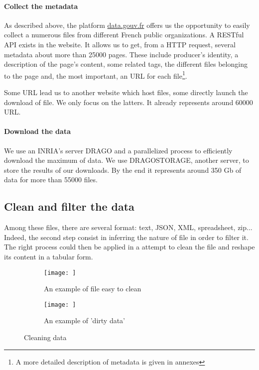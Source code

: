 \documentclass[a4paper]{article}
\begin{document}
	\paragraph{Collect the metadata}
	
	As described above, the platform \href{http://www.data.gouv.fr/fr/}{data.gouv.fr} offers us the opportunity to easily collect a numerous files from different French public organizations. A RESTful API exists in the website. It allows us to get, from a HTTP request, several metadata about more than 25000 pages. These include producer's identity, a description of the page's content, some related tags, the different files belonging to the page and, the most important, an URL for each file\footnote{A more detailed description of metadata is given in annexes}. 
	
	Some URL lead us to another website which host files, some directly launch the download of file. We only focus on the latters. It already represents around 60000 URL.
	
	\paragraph{Download the data}
	
	We use an INRIA's server DRAGO and a parallelized process to efficiently download the maximum of data. We use DRAGOSTORAGE, another server, to store the results of our downloads. By the end it represents around 350 Gb of data for more than 55000 files.
	
	\subsection{Clean and filter the data}
	
	Among these files, there are several format: text, JSON, XML, spreadsheet, zip... Indeed, the second step consist in inferring the nature of file in order to filter it. The right process could then be applied in a attempt to clean the file and reshape its content in a tabular form.
	
	\begin{figure}
		\centering
		\begin{subfigure}{0.50\textwidth}
			\centering
			\texttt{[image: ]}
			\caption{An example of file easy to clean}
			\label{fig:good-table}
		\end{subfigure}
		\begin{subfigure}{0.50\textwidth}
			\centering
			\texttt{[image: ]}
			\caption{An example of 'dirty data'}
			\label{fig:bad-table}
		\end{subfigure}
		\caption{Cleaning data}
		\label{fig:example-table}
	\end{figure}
	
\end{document}
